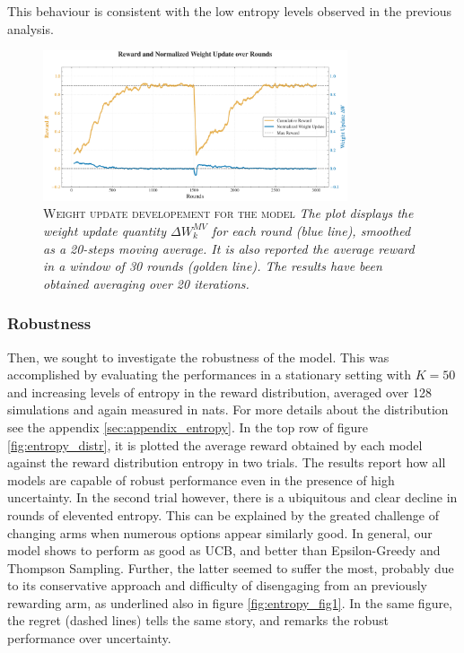 This behaviour is consistent with the low entropy levels observed in the previous analysis.


\begin{figure}[H]
    \centering
    \includegraphics[width=0.8\textwidth]{figures/reward_update_plot.pdf}
    \caption{\textsc{Weight update developement for the model} \textit{The plot displays the weight update quantity $\Delta W_{k}^{MV}$ for each round (blue line), smoothed as a 20-steps moving average.
    It is also reported the average reward in a window of 30 rounds (golden line). The results have been obtained averaging over 20 iterations.}}
    \label{fig:rew_update}
\end{figure}


\subsubsection{Robustness}

\noindent Then, we sought to investigate the robustness of the model.
This was accomplished by evaluating the performances in a stationary setting with $K=50$ and increasing levels of entropy in the reward distribution, averaged over 128 simulations and again measured in nats.
For more details about the distribution see the appendix \ref{sec:appendix_entropy}.
In the top row of figure \ref{fig:entropy_distr}, it is plotted the average reward obtained by each model against the reward distribution entropy in two trials.
The results report how all models are capable of robust performance even in the presence of high uncertainty.
In the second trial however, there is a ubiquitous and clear decline in rounds of elevented entropy. This can be explained by the greated challenge of changing arms when numerous options appear similarly good.
In general, our model shows to perform as good as UCB, and better than Epsilon-Greedy and Thompson Sampling.
Further, the latter seemed to suffer the most, probably due to its conservative approach and difficulty of disengaging from an previously rewarding arm, as underlined also in figure \ref{fig:entropy_fig1}.
In the same figure, the regret (dashed lines) tells the same story, and remarks the robust performance over uncertainty.

